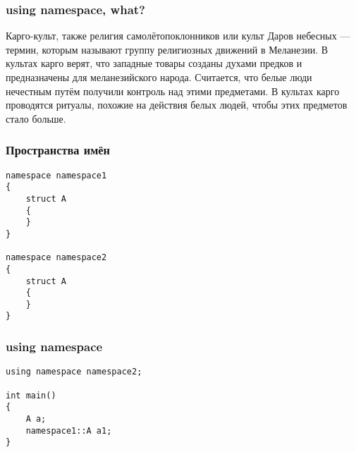 \documentclass[xetex,mathserif,serif]{beamer}
\begin{document}
	\begin{frame}
		\frametitle{using namespace, what?}
		Карго-культ, также религия самолётопоклонников или культ Даров небесных --- термин, которым называют группу религиозных движений в Меланезии. В культах карго верят, что западные товары созданы духами предков и предназначены для меланезийского народа. Считается, что белые люди нечестным путём получили контроль над этими предметами. В культах карго проводятся ритуалы, похожие на действия белых людей, чтобы этих предметов стало больше.
	\end{frame}

	\begin{frame}[fragile]
		\frametitle{Пространства имён}
		\begin{verbatim}
namespace namespace1 
{
    struct A 
    {
    }
}

namespace namespace2 
{
    struct A 
    {
    }
}
		\end{verbatim}
	\end{frame}

	\begin{frame}[fragile]
		\frametitle{using namespace}
		\begin{verbatim}
using namespace namespace2;

int main()
{
    A a;
    namespace1::A a1;
}
		\end{verbatim}
	\end{frame}
\end{document}
